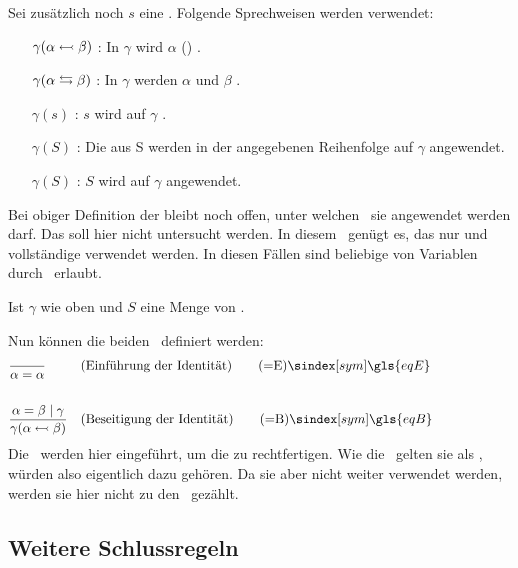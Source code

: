 {Sei zusätzlich noch $s$ eine .
Folgende Sprechweisen werden verwendet:
\begin{itemize}
	\renewcommand*{\itemindent}{1,5cm}
	\renewcommand*{\labelsep}{5pt}
	\item [$\gamma(\alpha \leftarrowtail \beta)$ :] In $\gamma$ wird $\alpha$ () .
	\item [$\gamma(\alpha \leftrightarrows \beta)$ :] In $\gamma$ werden $\alpha$ und $\beta$ .
	\item [$\gamma(s)$ :] $s$ wird auf $\gamma$ .
	\item [$\gamma(S)$ :] Die  aus S werden in der angegebenen Reihenfolge auf $\gamma$ angewendet.
	\item [$\gamma(S)$ :] $S$ wird auf $\gamma$ angewendet.
\end{itemize}
%
Bei obiger Definition der  bleibt noch offen, unter welchen \Voraussetzungen\ sie angewendet werden darf. Das soll hier nicht untersucht werden. In diesem \sectionname\ genügt es, das nur  und vollständige  verwendet werden.
In diesen Fällen sind beliebige  von Variablen durch \Formeln\ erlaubt.

Ist $\gamma$ wie oben und $S$ eine Menge von .

Nun können die beiden \Identitaetsregeln\ definiert werden:
\begin{align}
	& \frac{}{\alpha\eq\alpha}
	& & (\text{Einführung der Identität})
	\tag{\tageqE} \sym{\gls{eqE}} \label{def:eqE}
	\\\\
	& \frac{\alpha\eq\beta \srand \gamma}{\gamma(\alpha\subst\beta)}
	& & (\text{Beseitigung der Identität})
	\tag{\tageqB} \sym{\gls{eqB}} \label{def:eqB}
	\formulatoleft
\end{align}
%
Die \Identitaetsregeln\ werden hier eingeführt, um die  zu rechtfertigen.
Wie die \Basisregeln\ gelten sie als \Axiome, würden also eigentlich dazu gehören.
Da sie aber nicht weiter verwendet werden, werden sie hier nicht zu den \Basisregeln\ gezählt.

\subsection{Weitere Schlussregeln}%
\label{sub:weitereSchlussregeln}

}
